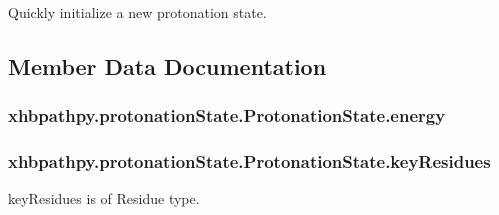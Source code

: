 Quickly initialize a new protonation state. 



\subsection{Member Data Documentation}
\hypertarget{classxhbpathpy_1_1protonation_state_1_1_protonation_state_a1d139aacc9359a9d4d1302c9d847ddd2}{
\subsubsection[{energy}]{\setlength{\rightskip}{0pt plus 5cm}xhbpathpy.\-protonation\-State.\-Protonation\-State.\-energy}}\label{classxhbpathpy_1_1protonation_state_1_1_protonation_state_a1d139aacc9359a9d4d1302c9d847ddd2}
\hypertarget{classxhbpathpy_1_1protonation_state_1_1_protonation_state_af533dcbaa6d972d40c47298d04b98643}{
\subsubsection[{key\-Residues}]{\setlength{\rightskip}{0pt plus 5cm}xhbpathpy.\-protonation\-State.\-Protonation\-State.\-key\-Residues}}\label{classxhbpathpy_1_1protonation_state_1_1_protonation_state_af533dcbaa6d972d40c47298d04b98643}


key\-Residues is of Residue type. 

